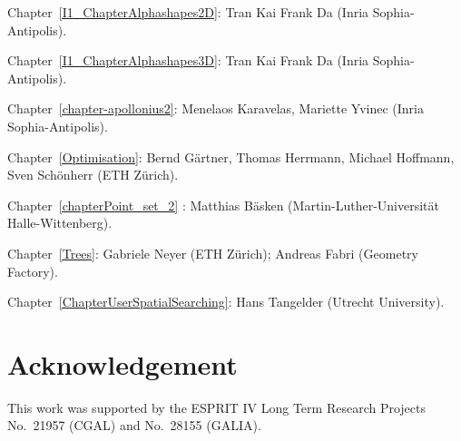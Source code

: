 \noindent
Chapter~\ref{I1_ChapterAlphashapes2D}: 
Tran Kai Frank Da ({\sc Inria} Sophia-Antipolis).

\noindent
Chapter~\ref{I1_ChapterAlphashapes3D}: 
Tran Kai Frank Da ({\sc Inria} Sophia-Antipolis).

\noindent
Chapter~\ref{chapter-apollonius2}: Menelaos Karavelas, Mariette Yvinec ({\sc Inria} Sophia-Antipolis).



\noindent
Chapter~\ref{Optimisation}: Bernd G\"artner, Thomas Herrmann, Michael Hoffmann,
Sven Sch\"onherr (ETH Z\"urich).

\noindent
Chapter~\ref{chapterPoint_set_2} : Matthias B\"asken (Martin-Luther-Universit{\"a}t Halle-Wittenberg).

\noindent
Chapter~\ref{Trees}: Gabriele Neyer (ETH Z\"urich); Andreas Fabri ({\sc Geometry Factory}).

\noindent
Chapter~\ref{ChapterUserSpatialSearching}: Hans Tangelder (Utrecht University).

\section*{Acknowledgement}


This work was supported
by the ESPRIT IV Long Term Research Projects No.~21957 (CGAL)
and No.~28155 (GALIA).


